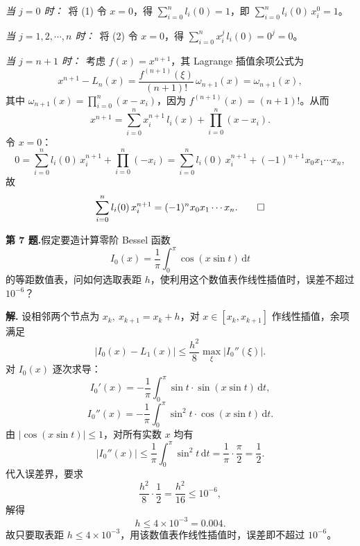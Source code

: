 \documentclass[UTF8,a4paper,11pt]{ctexart}
\newcommand*{\QED}{\hfill\ensuremath{\square}}
\begin{document}
\noindent\textit{当 $j=0$ 时：}\ 将 (1) 令 $x=0$，得 $\displaystyle\sum_{i=0}^n l_i(0)=1$，即 $\displaystyle\sum_{i=0}^n l_i(0)\,x_i^0=1$。

\medskip
\noindent\textit{当 $j=1,2,\cdots,n$ 时：}\ 将 (2) 令 $x=0$，得
$\displaystyle\sum_{i=0}^n x_i^j\,l_i(0)=0^j=0$。

\medskip
\noindent\textit{当 $j=n+1$ 时：}\ 考虑 $f(x)=x^{n+1}$，其 Lagrange 插值余项公式为
\[
  x^{n+1} - L_n(x) = \frac{f^{(n+1)}(\xi)}{(n+1)!}\,\omega_{n+1}(x)
  = \omega_{n+1}(x),
\]
其中 $\omega_{n+1}(x)=\prod_{i=0}^n(x-x_i)$，因为 $f^{(n+1)}(x)=(n+1)!$。从而
\[
  x^{n+1} = \sum_{i=0}^n x_i^{n+1}\,l_i(x) + \prod_{i=0}^n(x-x_i).
\]
令 $x=0$：
\[
  0 = \sum_{i=0}^n l_i(0)\,x_i^{n+1} + \prod_{i=0}^n(-x_i)
    = \sum_{i=0}^n l_i(0)\,x_i^{n+1} + (-1)^{n+1}x_0 x_1\cdots x_n,
\]
故
\[
  \sum_{i=0}^n l_i(0)\,x_i^{n+1} = (-1)^n x_0 x_1\cdots x_n.\qquad\QED
\]

\bigskip\bigskip

\noindent\textbf{第 7 题.}\quad 假定要造计算零阶 Bessel 函数
\[
  I_0(x) = \frac{1}{\pi}\int_0^{\pi}\cos(x\sin t)\,\mathrm{d}t
\]
的等距数值表，问如何选取表距 $h$，使利用这个数值表作线性插值时，误差不超过 $10^{-6}$？

\medskip
\noindent\textbf{解.}\quad
设相邻两个节点为 $x_k,\ x_{k+1}=x_k+h$，对 $x\in[x_k,x_{k+1}]$ 作线性插值，余项满足
\[
  |I_0(x)-L_1(x)|\leqslant\frac{h^2}{8}\max_{\xi}\bigl|I_0''(\xi)\bigr|.
\]
对 $I_0(x)$ 逐次求导：
\[
  I_0'(x)  = -\frac{1}{\pi}\int_0^{\pi}\sin t\cdot\sin(x\sin t)\,\mathrm{d}t,
\]
\[
  I_0''(x) = -\frac{1}{\pi}\int_0^{\pi}\sin^2 t\cdot\cos(x\sin t)\,\mathrm{d}t.
\]
由 $|\cos(x\sin t)|\leqslant 1$，对所有实数 $x$ 均有
\[
  \bigl|I_0''(x)\bigr|
  \leqslant \frac{1}{\pi}\int_0^{\pi}\sin^2 t\,\mathrm{d}t
  = \frac{1}{\pi}\cdot\frac{\pi}{2} = \frac{1}{2}.
\]
代入误差界，要求
\[
  \frac{h^2}{8}\cdot\frac{1}{2} = \frac{h^2}{16} \leqslant 10^{-6},
\]
解得
\[
  h \leqslant 4\times 10^{-3} = 0.004.
\]
故只要取表距 $h\leqslant 4\times 10^{-3}$，用该数值表作线性插值时，误差即不超过 $10^{-6}$。
\end{document}
